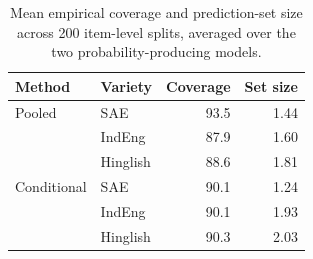 \begin{table}[t]
\centering
\caption{Mean empirical coverage and prediction-set size across 200 item-level splits, averaged over the two probability-producing models.}
\label{tab:conformal-summary}
\small
\begin{tabular}{llrr}
\toprule
Method & Variety & Coverage & Set size \\
\midrule
Pooled & SAE & 93.5 & 1.44 \\
 & IndEng & 87.9 & 1.60 \\
 & Hinglish & 88.6 & 1.81 \\
\addlinespace
Conditional & SAE & 90.1 & 1.24 \\
 & IndEng & 90.1 & 1.93 \\
 & Hinglish & 90.3 & 2.03 \\
\bottomrule
\end{tabular}
\end{table}
